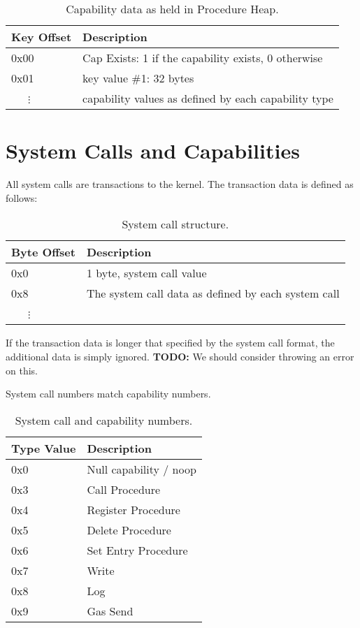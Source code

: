\documentclass[english,a4paper]{article}
\begin{document}
\begin{table}[H]
  \caption{Capability data as held in Procedure Heap.}
  \centering{}%
  \begin{tabularx}{\textwidth}{l|X}
    \hline
    Key Offset & Description \\
    \hline
    \hline
    0x00       & Cap Exists: 1 if the capability exists, 0 otherwise \\
    0x01       & key value \#1: 32 bytes \\
    ~~~$\vdots$ & capability values as defined by each capability type \\
    \hline
  \end{tabularx}
\end{table}

\section{System Calls and Capabilities}
All system calls are transactions to the kernel. The transaction data is defined
as follows:

\begin{table}[H]
  \caption{System call structure.}
  \centering{}%
  \begin{tabular}{l|p{}}
    \hline
    Byte Offset & Description\tabularnewline
    \hline
    \hline
    0x0 & 1 byte, system call value \tabularnewline
    0x8 & The system call data as defined by each system call \tabularnewline
    ~~~$\vdots$ &  \tabularnewline
    \hline
  \end{tabular}
\end{table}

If the transaction data is longer that specified by the system call format, the
additional data is simply ignored. \textbf{TODO:} We should consider throwing an
error on this.

System call numbers match capability numbers.

\begin{table}[H]
  \caption{System call and capability numbers.\label{syscall-numbers}}
  \centering{}%
  \begin{tabular}{l|p{}}
    \hline
    Type Value & Description\tabularnewline
    \hline
    \hline
    0x0 & Null capability / noop \tabularnewline
    0x3 & Call Procedure \tabularnewline
    0x4 & Register Procedure \tabularnewline
    0x5 & Delete Procedure \tabularnewline
    0x6 & Set Entry Procedure \tabularnewline
    0x7 & Write \tabularnewline
    0x8 & Log \tabularnewline
    0x9 & Gas Send \tabularnewline
    \hline
  \end{tabular}
\end{table}
\end{document}
